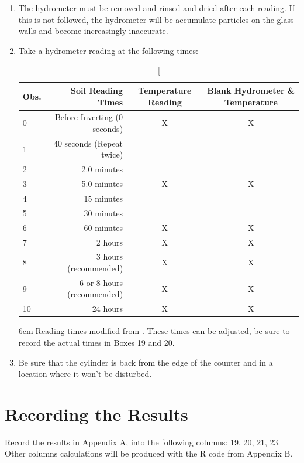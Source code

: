 \documentclass{tufte-handout}
\begin{document}
\begin{enumerate}
		\item The hydrometer must be removed and rinsed and dried after each reading. If this is not followed, the hydrometer will be accumulate particles on the glass walls and become increasingly inaccurate. 

	\item Take a hydrometer reading at the following times:
	
		\begin{table}
		\begin{tabular}{lrcc}\hline
Obs. & Soil Reading Times & Temperature Reading		& Blank Hydrometer \& Temperature \\ \hline\hline	
0		& Before Inverting (0 seconds)		&	 X	&		X		\\
1		& 40 seconds (Repeat twice) 			&	 		&			  \\
2		&	2.0 minutes 										&			&       \\
3		&	5.0 minutes 										&	 X 	&		X   \\
4		&	15 minutes 											&	 		&   	  \\
5	 	& 30 minutes 											&			&				\\
6		& 60 minutes 											&		X	& 	X		\\
7		& 2	hours													& 	X	& 	X		\\
8		& 3 hours (recommended)							&		X	& 	X		\\
9   & 6 or 8 hours (recommended)					&		X	& 	X		\\
10		& 24 hours											&		X	&  	X 	\\\hline		
		\end{tabular}
		\caption[][6cm]{Reading times modified from \citet{standard2007d422}. These times can be adjusted, be sure to record the actual times in Boxes 19 and 20.}
		\label{tab:ReadingTimes}
	\end{table}
	
	\item Be sure that the cylinder is back from the edge of the counter and in a location where it won't be disturbed.	
	
\end{enumerate}

\section{Recording the Results}

Record the results in Appendix A, into the following columns: 19, 20, 21, 23. Other columns calculations will be produced with the R code from Appendix B.  
\end{document}
